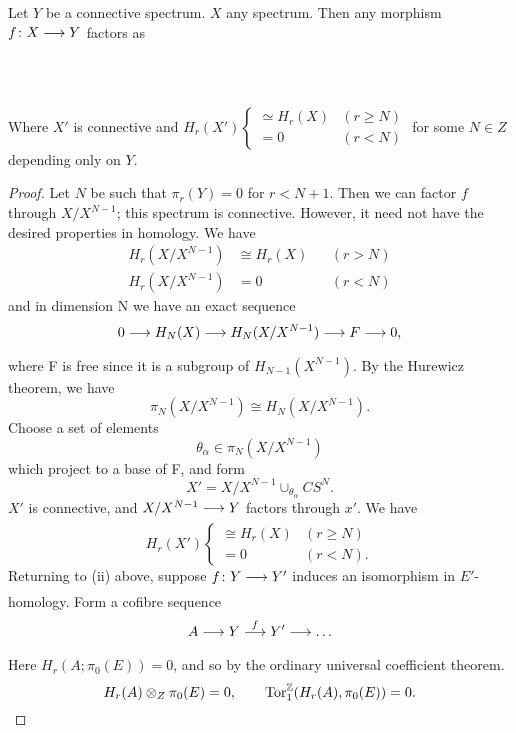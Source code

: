 \documentclass[../main]{subfiles}
\begin{document}
\begin{lemma} \label{lem:p3ch14.14}
Let $Y$ be a connective spectrum. $X$ any spectrum. Then any morphism $f\colon  X \lar{}  Y $ factors as 
~\\~\\
~\\~\\
Where $X'$ is connective and $H_{r}(X') \begin{cases}\simeq H_{r}(X) & (r \ge N)\\ =0 & (r < N)\end{cases}$ for some $N \in Z$ depending only on $Y$. 
\begin{proof} 
  Let $N$ be such that $\pi_{r}(Y)=0$ for $r < N + 1$. Then we can factor $f$ through  $X/ X^{N-1}$; this spectrum is connective. However, it need not have the desired properties in homology. We have
  \begin{align*}
    H_{r}(X / X^{N-1}) &\cong H_{r}(X) &&(r > N) \\[0.5em]
    H_{r}(X / X^{N-1}) &= 0   &&(r < N)
  \end{align*}
  and in dimension N we have an exact sequence 
  \[
    0 \lar{} H_{N}(X) \lar{} H_{N} (X / X^{N-1}) \lar{} F \lar{} 0,
  \] 
  where F is free since it is a subgroup of $H_{N-1}(X^{N-1})$. By the Hurewicz theorem, we have 
  \[
    \pi_{N}(X / X^{N-1})\cong H_{N} (X / X^{N-1}). 
  \] 
  Choose a set of elements
  \[
    \theta_{\alpha} \in \pi_{N}(X / X^{N-1})
  \] 
  which project to a base of F, and form
  \[
    X' = X / X^{N-1} \cup_{\theta_{\alpha}} CS^N. 
  \] 
  $X'$ is connective, and $X / X^{N-1} \lar{} Y$ factors through $x'$. We have
  \[
  H_{r}(X')
    \begin{cases} 
      \cong H_{r}(X) & (r \ge N)\\
      =0 & (r < N).
    \end{cases}
  \] 
  Returning to (ii) above, suppose $f\colon  Y \lar{}  Y' $ induces an isomorphism in $E'$-homology. Form a cofibre sequence 
  \[
    A \lar{} Y \vra{f} Y' \lar{} \ldots
  \] 
  Here  $H_{r}(A;\pi_{0}(E))=0$, and so by the ordinary universal coefficient theorem.
  \[
  H_{r}(A)\otimes_{Z} \pi_{0}(E)=0, \qquad \mathrm{Tor}^{\mathbb{Z}}_{1} (H_{r}(A), \pi_{0}(E))=0.
  \] 

\end{proof}
\end{lemma}
\end{document}
